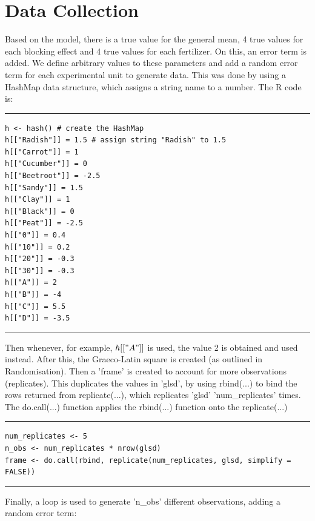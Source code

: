 \documentclass{article}
\begin{document}
\section{Data Collection}
Based on the model, there is a true value for the general mean, 4 true values for each blocking effect and 4 true values for each fertilizer. On this, an error term is added. We define arbitrary values to these parameters and add a random error term for each experimental unit to generate data. This was done by using a HashMap data structure, which assigns a string name to a number. The R code is:
\par\noindent\rule{\textwidth}{0.4pt}
\vspace{-25pt} %
\begin{verbatim}
h <- hash() # create the HashMap
h[["Radish"]] = 1.5 # assign string "Radish" to 1.5
h[["Carrot"]] = 1
h[["Cucumber"]] = 0
h[["Beetroot"]] = -2.5
h[["Sandy"]] = 1.5
h[["Clay"]] = 1
h[["Black"]] = 0
h[["Peat"]] = -2.5
h[["0"]] = 0.4
h[["10"]] = 0.2
h[["20"]] = -0.3
h[["30"]] = -0.3
h[["A"]] = 2
h[["B"]] = -4
h[["C"]] = 5.5
h[["D"]] = -3.5
\end{verbatim}
\vspace{-15pt} %
\par\noindent\rule{\textwidth}{0.4pt}
Then whenever, for example, $h[["A"]]$ is used, the value 2 is obtained and used instead. After this, the Graeco-Latin square is created (as outlined in Randomisation). Then a 'frame' is created to account for more observations (replicates). This duplicates the values in 'glsd', by using rbind(...) to bind the rows returned from replicate(...), which replicates 'glsd' 'num\_replicates' times. The do.call(...) function applies the rbind(...) function onto the replicate(...)
\par\noindent\rule{\textwidth}{0.4pt}
\vspace{-25pt} %
\begin{verbatim}
num_replicates <- 5
n_obs <- num_replicates * nrow(glsd)
frame <- do.call(rbind, replicate(num_replicates, glsd, simplify = FALSE))
\end{verbatim}
\vspace{-15pt} %
\par\noindent\rule{\textwidth}{0.4pt}
Finally, a loop is used to generate 'n\_obs' different observations, adding a random error term:
\end{document}
